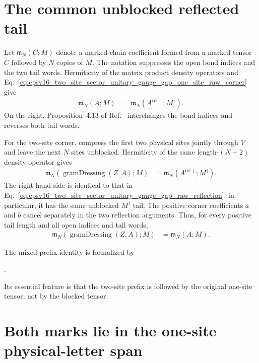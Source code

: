 \documentclass{article}
\begin{document}
\section{The common unblocked reflected tail}

Let $\mathfrak m_N(C;M)$ denote a marked-chain coefficient formed from a
marked tensor $C$ followed by $N$ copies of $M$. The notation suppresses the
open bond indices and the two tail words. Hermiticity of the matrix product
density operators and
Eq.~\ref{eq:cpsv16_two_site_sector_unitary_gauge_gap_one_site_raw_corner}
give
\begin{align}
    \mathfrak m_N(A;M)
    &=\mathfrak m_N(A^{\mathrm{ref}\dagger};M^\dagger).
    \label{eq:cpsv16_two_site_sector_unitary_gauge_gap_raw_reflection}
\end{align}
On the right, Proposition~4.13 of Ref.~\cite{Cirac2016MPDO_arXiv} interchanges
the bond indices and reverses both tail words.

For the two-site corner, compress the first two physical sites jointly
through $V$ and leave the next $N$ sites unblocked. Hermiticity of the same
length-$(N+2)$ density operator gives
\begin{align}
    \mathfrak m_N(\operatorname{gramDressing}(Z,A);M)
    &=\mathfrak m_N(A^{\mathrm{ref}\dagger};M^\dagger).
    \label{eq:cpsv16_two_site_sector_unitary_gauge_gap_dressed_reflection}
\end{align}
The right-hand side is identical to that in
Eq.~\ref{eq:cpsv16_two_site_sector_unitary_gauge_gap_raw_reflection}; in
particular, it has the same unblocked $M^\dagger$ tail. The positive corner
coefficients $a$ and $b$ cancel separately in the two reflection arguments.
Thus, for every positive tail length and all open indices and tail words,
\begin{align}
    \mathfrak m_N(\operatorname{gramDressing}(Z,A);M)
    &=\mathfrak m_N(A;M).
    \label{eq:cpsv16_two_site_sector_unitary_gauge_gap_raw_dressed_marked_chain}
\end{align}

The mixed-prefix identity is formalized by
\begin{center}
\scriptsize
\mbox{.}
\end{center}
Its essential feature is that the two-site prefix is followed by the original
one-site tensor, not by the blocked tensor.

\section{Both marks lie in the one-site physical-letter span}
\end{document}
